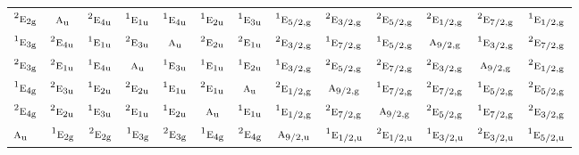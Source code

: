 \documentclass[10pt,a4paper]{article}
\numberwithin{equation}{section}
\newcommand{\irr}[1]{\text{\normalfont\scshape #1}}
\newcommand{\conjpair}[1]{{}^{#1}}
\newcommand{\ptag}[1]{\mathrm{#1}}
\begin{document}
{\begin{longtable}{@{}lcccccccccccc@{}}
$\conjpair{2}\irr{e}_{2\ptag{g}}$ & $\irr{a}_{\ptag{u}}$ & $\conjpair{2}\irr{e}_{4\ptag{u}}$ & $\conjpair{1}\irr{e}_{1\ptag{u}}$ & $\conjpair{1}\irr{e}_{4\ptag{u}}$ & $\conjpair{1}\irr{e}_{2\ptag{u}}$ & $\conjpair{1}\irr{e}_{3\ptag{u}}$ & $\conjpair{1}\irr{e}_{5/2,\ptag{g}}$ & $\conjpair{2}\irr{e}_{3/2,\ptag{g}}$ & $\conjpair{2}\irr{e}_{5/2,\ptag{g}}$ & $\conjpair{2}\irr{e}_{1/2,\ptag{g}}$ & $\conjpair{2}\irr{e}_{7/2,\ptag{g}}$ & $\conjpair{1}\irr{e}_{1/2,\ptag{g}}$\\
$\conjpair{1}\irr{e}_{3\ptag{g}}$ & $\conjpair{2}\irr{e}_{4\ptag{u}}$ & $\conjpair{1}\irr{e}_{1\ptag{u}}$ & $\conjpair{2}\irr{e}_{3\ptag{u}}$ & $\irr{a}_{\ptag{u}}$ & $\conjpair{2}\irr{e}_{2\ptag{u}}$ & $\conjpair{2}\irr{e}_{1\ptag{u}}$ & $\conjpair{2}\irr{e}_{3/2,\ptag{g}}$ & $\conjpair{1}\irr{e}_{7/2,\ptag{g}}$ & $\conjpair{1}\irr{e}_{5/2,\ptag{g}}$ & $\irr{a}_{9/2,\ptag{g}}$ & $\conjpair{1}\irr{e}_{3/2,\ptag{g}}$ & $\conjpair{2}\irr{e}_{7/2,\ptag{g}}$\\
$\conjpair{2}\irr{e}_{3\ptag{g}}$ & $\conjpair{2}\irr{e}_{1\ptag{u}}$ & $\conjpair{1}\irr{e}_{4\ptag{u}}$ & $\irr{a}_{\ptag{u}}$ & $\conjpair{1}\irr{e}_{3\ptag{u}}$ & $\conjpair{1}\irr{e}_{1\ptag{u}}$ & $\conjpair{1}\irr{e}_{2\ptag{u}}$ & $\conjpair{1}\irr{e}_{3/2,\ptag{g}}$ & $\conjpair{2}\irr{e}_{5/2,\ptag{g}}$ & $\conjpair{2}\irr{e}_{7/2,\ptag{g}}$ & $\conjpair{2}\irr{e}_{3/2,\ptag{g}}$ & $\irr{a}_{9/2,\ptag{g}}$ & $\conjpair{2}\irr{e}_{1/2,\ptag{g}}$\\
$\conjpair{1}\irr{e}_{4\ptag{g}}$ & $\conjpair{2}\irr{e}_{3\ptag{u}}$ & $\conjpair{1}\irr{e}_{2\ptag{u}}$ & $\conjpair{2}\irr{e}_{2\ptag{u}}$ & $\conjpair{1}\irr{e}_{1\ptag{u}}$ & $\conjpair{2}\irr{e}_{1\ptag{u}}$ & $\irr{a}_{\ptag{u}}$ & $\conjpair{2}\irr{e}_{1/2,\ptag{g}}$ & $\irr{a}_{9/2,\ptag{g}}$ & $\conjpair{1}\irr{e}_{7/2,\ptag{g}}$ & $\conjpair{2}\irr{e}_{7/2,\ptag{g}}$ & $\conjpair{1}\irr{e}_{5/2,\ptag{g}}$ & $\conjpair{2}\irr{e}_{5/2,\ptag{g}}$\\
$\conjpair{2}\irr{e}_{4\ptag{g}}$ & $\conjpair{2}\irr{e}_{2\ptag{u}}$ & $\conjpair{1}\irr{e}_{3\ptag{u}}$ & $\conjpair{2}\irr{e}_{1\ptag{u}}$ & $\conjpair{1}\irr{e}_{2\ptag{u}}$ & $\irr{a}_{\ptag{u}}$ & $\conjpair{1}\irr{e}_{1\ptag{u}}$ & $\conjpair{1}\irr{e}_{1/2,\ptag{g}}$ & $\conjpair{2}\irr{e}_{7/2,\ptag{g}}$ & $\irr{a}_{9/2,\ptag{g}}$ & $\conjpair{2}\irr{e}_{5/2,\ptag{g}}$ & $\conjpair{1}\irr{e}_{7/2,\ptag{g}}$ & $\conjpair{2}\irr{e}_{3/2,\ptag{g}}$\\
$\irr{a}_{\ptag{u}}$ & $\conjpair{1}\irr{e}_{2\ptag{g}}$ & $\conjpair{2}\irr{e}_{2\ptag{g}}$ & $\conjpair{1}\irr{e}_{3\ptag{g}}$ & $\conjpair{2}\irr{e}_{3\ptag{g}}$ & $\conjpair{1}\irr{e}_{4\ptag{g}}$ & $\conjpair{2}\irr{e}_{4\ptag{g}}$ & $\irr{a}_{9/2,\ptag{u}}$ & $\conjpair{1}\irr{e}_{1/2,\ptag{u}}$ & $\conjpair{2}\irr{e}_{1/2,\ptag{u}}$ & $\conjpair{1}\irr{e}_{3/2,\ptag{u}}$ & $\conjpair{2}\irr{e}_{3/2,\ptag{u}}$ & $\conjpair{1}\irr{e}_{5/2,\ptag{u}}$\\

\end{longtable}}
\end{document}
